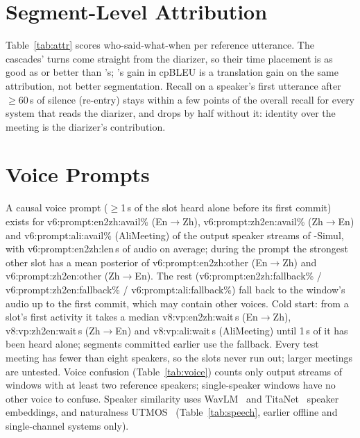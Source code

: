 \section{Segment-Level Attribution}
\label{app:attr}



Table~\ref{tab:attr} scores who-said-what-when per reference utterance. The cascades' turns come straight from the
diarizer, so their time placement is as good as or better than \sys{}'s; \sys{}'s gain in cpBLEU is a translation gain on
the same attribution, not better segmentation. Recall on a speaker's first utterance after $\ge$60\,s of silence (re-entry)
stays within a few points of the overall recall for every system that reads the diarizer, and drops by half without
it: identity over the meeting is the diarizer's contribution.

\section{Voice Prompts}
\label{app:voice}

A causal voice prompt ($\ge$1\,s of the slot heard alone before its first commit) exists for
\num{v6:prompt:en2zh:avail}\% (En$\rightarrow$Zh), \num{v6:prompt:zh2en:avail}\% (Zh$\rightarrow$En) and
\num{v6:prompt:ali:avail}\% (AliMeeting) of the output speaker streams of \sys{}-Simul, with
\num{v6:prompt:en2zh:len}\,s of audio on average; during the prompt the strongest other slot has a mean posterior of
\num{v6:prompt:en2zh:other} (En$\rightarrow$Zh) and \num{v6:prompt:zh2en:other} (Zh$\rightarrow$En). The rest
(\num{v6:prompt:en2zh:fallback}\% / \num{v6:prompt:zh2en:fallback}\% / \num{v6:prompt:ali:fallback}\%) fall back to the
window's audio up to the first commit, which may contain other voices. Cold start: from a slot's first activity it takes a median
\num{v8:vp:en2zh:wait}\,s (En$\rightarrow$Zh), \num{v8:vp:zh2en:wait}\,s (Zh$\rightarrow$En) and \num{v8:vp:ali:wait}\,s
(AliMeeting) until 1\,s of it has been heard alone; segments committed earlier use the fallback. Every test meeting has fewer than eight
speakers, so the slots never run out; larger meetings are untested. Voice confusion (Table~\ref{tab:voice}) counts only
output streams of windows with at least two reference speakers; single-speaker windows have no other voice to confuse.
Speaker similarity uses WavLM~\citep{chen2022wavlm} and TitaNet~\citep{koluguri2022titanet} speaker embeddings, and
naturalness UTMOS~\citep{saeki2022utmos} (Table~\ref{tab:speech}, earlier offline and single-channel systems only).

